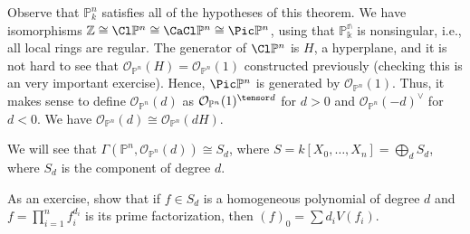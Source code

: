 Observe that $\mathbb{P}_k^n$ satisfies all of the hypotheses of this theorem.
We have isomorphisms $\mathbb{Z} \cong \Cl \mathbb{P}^n \cong \CaCl \mathbb{P}^n \cong \Pic \mathbb{P}^n$,
using that $\mathbb{\mathbb{P}^n_k}$ is nonsingular, i.e., all local rings are
regular. The generator of $\Cl \mathbb{P}^n$ is $H$, a hyperplane, and it is not hard to see
that $\mathcal{O}_{\mathbb{P}^n}(H) = \mathcal{O}_{\mathbb{P}^n}(1)$ constructed previously
(checking this is an very important exercise). Hence, $\Pic \mathbb{P}^n$ is generated by
$\mathcal{O}_{\mathbb{P}^n}(1)$. Thus, it makes sense to define $\mathcal{O}_{\mathbb{P}^n}(d)$
as $\mathcal{O}_{\mathbb{P}^n}(1)^{\tensor d}$ for $d > 0$ and $\mathcal{O}_{\mathbb{P}^n}(-d)^{\vee}$
for $d < 0$. We have $\mathcal{O}_{\mathbb{P}^n}(d) \cong \mathcal{O}_{\mathbb{P}^n}(dH)$.

We will see that $\Gamma(\mathbb{P}^n, \mathcal{O}_{\mathbb{P}^n}(d))\cong S_d$, where
$S = k[X_0, \ldots, X_n] = \bigoplus_d S_d$, where $S_d$ is the component of degree $d$.

As an exercise, show that if $f \in S_d$ is a homogeneous polynomial of degree $d$
and $f = \prod_{i=1}^n f_i^{d_i}$ is its prime factorization, then
$(f)_0 = \sum d_i V(f_i)$.
